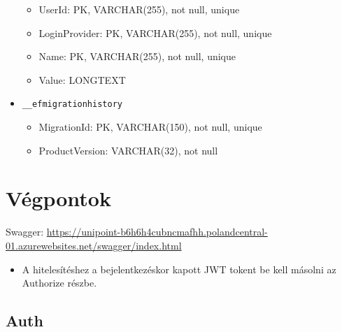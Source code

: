 \documentclass[11pt]{article}
\begin{document}
\begin{itemize}
\begin{itemize}
\item UserId: PK, VARCHAR(255), not null, unique
\item LoginProvider: PK, VARCHAR(255), not null, unique
\item Name: PK, VARCHAR(255), not null, unique
\item Value: LONGTEXT
\end{itemize}
\item \texttt{\_\_efmigrationhistory}
\begin{itemize}
\item MigrationId: PK, VARCHAR(150), not null, unique
\item ProductVersion: VARCHAR(32), not null
\end{itemize}
\end{itemize}
\section{Végpontok}
\label{sec:org16fa1ac}
Swagger: \url{https://unipoint-b6h6h4cubncmafhh.polandcentral-01.azurewebsites.net/swagger/index.html}
\begin{itemize}
\item A hitelesítéshez a bejelentkezéskor kapott JWT tokent be kell másolni az Authorize részbe.
\end{itemize}
\subsection{Auth}
\label{sec:org7f68c98}
\end{document}
